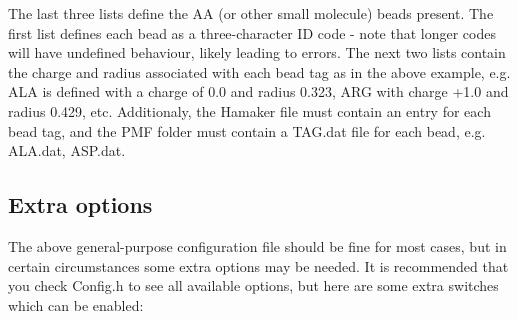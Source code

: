 \documentclass[10pt,a4paper,onecolumn]{report}
\begin{document}
The last three lists define the AA (or other small molecule) beads present. The first list defines each bead as a three-character ID code - note that longer codes will have undefined behaviour, likely leading to errors. The next two lists contain the charge and radius associated with each bead tag as in the above example, e.g. ALA is defined with a charge of 0.0 and radius 0.323, ARG with charge +1.0 and radius 0.429, etc.  Additionaly, the Hamaker file must contain an entry for each bead tag, and the PMF folder must contain a TAG.dat file for each bead, e.g. ALA.dat, ASP.dat.  

\subsection{Extra options}
The above general-purpose configuration file should be fine for most cases, but in certain circumstances some extra options may be needed. It is recommended that you check Config.h to see all available options, but here are some extra switches which can be enabled:
\end{document}
